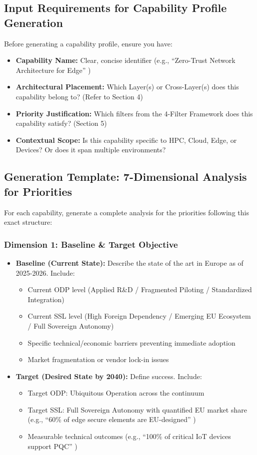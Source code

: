 \documentclass{ieeeaccess}
\begin{document}
\subsection*{Input Requirements for Capability Profile Generation}
Before generating a capability profile, ensure you have:
\begin{itemize}
    \item \textbf{Capability Name:} Clear, concise identifier (e.g., ``Zero-Trust Network Architecture for Edge'' )
    \item \textbf{Architectural Placement:} Which Layer(s) or Cross-Layer(s) does this capability belong to? (Refer to Section 4)
    \item \textbf{Priority Justification:} Which filters from the 4-Filter Framework does this capability satisfy? (Section 5)
    \item \textbf{Contextual Scope:} Is this capability specific to HPC, Cloud, Edge, or Devices? Or does it span multiple environments?
\end{itemize}

\subsection*{Generation Template: 7-Dimensional Analysis for Priorities}
For each capability, generate a complete analysis for the priorities following this exact structure:

\subsubsection*{Dimension 1: Baseline \& Target Objective}
\begin{itemize}
    \item \textbf{Baseline (Current State):} Describe the state of the art in Europe as of 2025-2026. Include:
    \begin{itemize}
        \item Current ODP level (Applied R\&D / Fragmented Piloting / Standardized Integration)
        \item Current SSL level (High Foreign Dependency / Emerging EU Ecosystem / Full Sovereign Autonomy)
        \item Specific technical/economic barriers preventing immediate adoption
        \item Market fragmentation or vendor lock-in issues
    \end{itemize}
    \item \textbf{Target (Desired State by 2040):} Define success. Include:
    \begin{itemize}
        \item Target ODP: Ubiquitous Operation across the continuum
        \item Target SSL: Full Sovereign Autonomy with quantified EU market share (e.g., ``60\% of edge secure elements are EU-designed'' )
        \item Measurable technical outcomes (e.g., ``100\% of critical IoT devices support PQC'' )
    \end{itemize}
\end{itemize}
\end{document}
